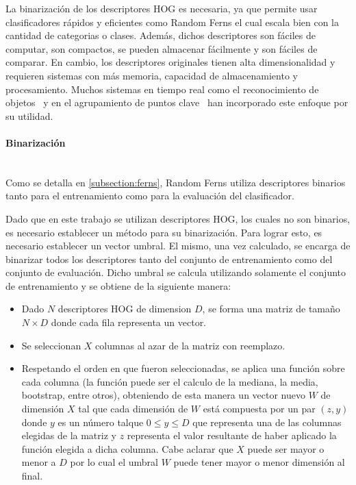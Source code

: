 	La binarización de los descriptores HOG es necesaria, ya que permite usar clasificadores rápidos y eficientes como Random Ferns el cual escala bien con la cantidad de categorias o clases. Además, dichos descriptores son fáciles de computar, son compactos, se pueden almacenar fácilmente y son fáciles de comparar. En cambio, los descriptores originales tienen alta dimensionalidad y requieren sistemas con más memoria, capacidad de almacenamiento y procesamiento. Muchos sistemas en tiempo real como el reconocimiento de objetos~\cite{SJC08} y en el agrupamiento de puntos clave~\cite{OFL07} han incorporado este enfoque por su utilidad.

	
	\paragraph{Binarización} ~\\
	
		Como se detalla en \ref{subsection:ferns}, Random Ferns utiliza descriptores binarios tanto para el entrenamiento como para la evaluación del clasificador.
		
		Dado que en este trabajo se utilizan descriptores HOG, los cuales no son binarios, es necesario establecer un método para su binarización. Para lograr esto, es necesario establecer un vector umbral. El mismo, una vez  calculado, se encarga de binarizar todos los descriptores tanto del conjunto de entrenamiento como del conjunto de evaluación. Dicho umbral se calcula utilizando solamente el conjunto de entrenamiento y se obtiene de la siguiente manera:
		
		\begin{itemize}
			\item Dado $N$ descriptores HOG de dimension $D$, se forma una matriz de tamaño $N \times D$ donde cada fila representa un vector.
			\item Se seleccionan $X$ columnas al azar de la matriz con reemplazo.
			\item Respetando el orden en que fueron seleccionadas, se aplica una función sobre cada columna (la función puede ser el calculo de la mediana, la media, bootstrap, entre otros), obteniendo de esta manera un vector nuevo $W$ de dimensión $X$ tal que cada dimensión de $W$ está compuesta por un par $(z,y)$ donde $y$ es un número talque $0 \leq y \leq D$ que representa una de las columnas elegidas de la matriz y $z$ representa el valor resultante de haber aplicado la función elegida a dicha columna. Cabe aclarar que $X$ puede ser mayor o menor a $D$ por lo cual el umbral $W$ puede tener mayor o menor dimensión al final.
		\end{itemize}
		
